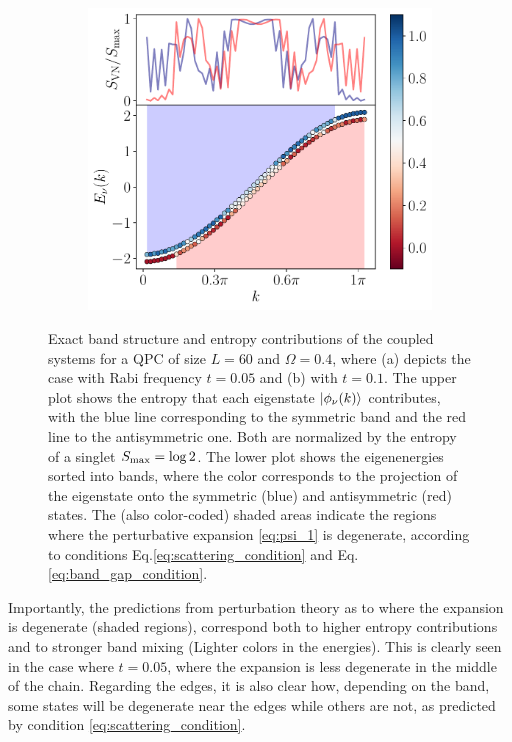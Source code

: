 \documentclass{article}
\begin{document}
\begin{figure}[h]
\begin{subfigure}[b]{0.43\textwidth}
        \includegraphics[width=\textwidth]{figures/report_08_2025/exact_energies_Lqpc=60_Omega=0.4_t=0.1.pdf}
        \caption{ }
    \end{subfigure}
    \caption{Exact band structure and entropy contributions of the coupled systems for a QPC of size $L=60$ and $\Omega=0.4$, where (a) depicts the case with Rabi frequency $t=0.05$ and (b) with $t=0.1$. The upper plot shows the entropy that each eigenstate $\ket{\phi_\nu (k)}$ contributes, with the blue line corresponding to the symmetric band and the red line to the antisymmetric one. Both are normalized by the entropy of a singlet $S_{\rm{max}}=\log{2}$. The lower plot shows the eigenenergies sorted into bands, where the color corresponds to the projection of the eigenstate onto the symmetric (blue) and antisymmetric (red) states. The (also color-coded) shaded areas indicate the regions where the perturbative expansion \eqref{eq:psi_1} is degenerate, according to conditions Eq.\eqref{eq:scattering_condition} and Eq.\eqref{eq:band_gap_condition}.}
    \label{fig:energy_bands}
\end{figure}

Importantly, the predictions from perturbation theory as to where the expansion is degenerate (shaded regions), correspond both to higher entropy contributions and to stronger band mixing (Lighter colors in the energies). This is clearly seen in the case where $t=0.05$, where the expansion is less degenerate in the middle of the chain. Regarding the edges, it is also clear how, depending on the band, some states will be degenerate near the edges while others are not, as predicted by condition \eqref{eq:scattering_condition}.
\end{document}
